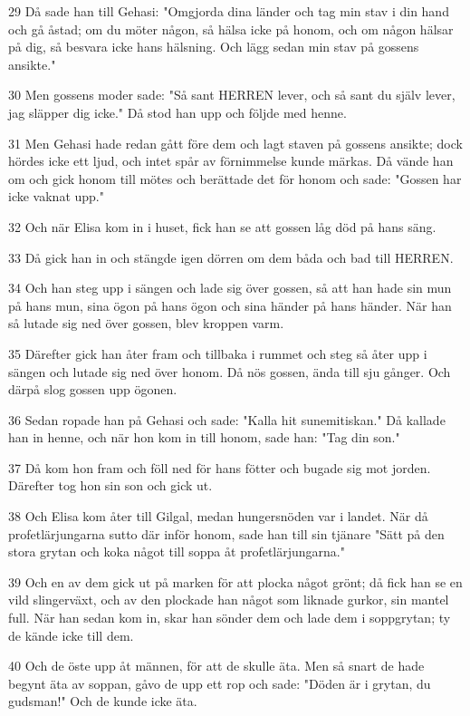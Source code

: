 \par 29 Då sade han till Gehasi: "Omgjorda dina länder och tag min stav i din hand och gå åstad; om du möter någon, så hälsa icke på honom, och om någon hälsar på dig, så besvara icke hans hälsning. Och lägg sedan min stav på gossens ansikte."
\par 30 Men gossens moder sade: "Så sant HERREN lever, och så sant du själv lever, jag släpper dig icke." Då stod han upp och följde med henne.
\par 31 Men Gehasi hade redan gått före dem och lagt staven på gossens ansikte; dock hördes icke ett ljud, och intet spår av förnimmelse kunde märkas. Då vände han om och gick honom till mötes och berättade det för honom och sade: "Gossen har icke vaknat upp."
\par 32 Och när Elisa kom in i huset, fick han se att gossen låg död på hans säng.
\par 33 Då gick han in och stängde igen dörren om dem båda och bad till HERREN.
\par 34 Och han steg upp i sängen och lade sig över gossen, så att han hade sin mun på hans mun, sina ögon på hans ögon och sina händer på hans händer. När han så lutade sig ned över gossen, blev kroppen varm.
\par 35 Därefter gick han åter fram och tillbaka i rummet och steg så åter upp i sängen och lutade sig ned över honom. Då nös gossen, ända till sju gånger. Och därpå slog gossen upp ögonen.
\par 36 Sedan ropade han på Gehasi och sade: "Kalla hit sunemitiskan." Då kallade han in henne, och när hon kom in till honom, sade han: "Tag din son."
\par 37 Då kom hon fram och föll ned för hans fötter och bugade sig mot jorden. Därefter tog hon sin son och gick ut.
\par 38 Och Elisa kom åter till Gilgal, medan hungersnöden var i landet. När då profetlärjungarna sutto där inför honom, sade han till sin tjänare "Sätt på den stora grytan och koka något till soppa åt profetlärjungarna."
\par 39 Och en av dem gick ut på marken för att plocka något grönt; då fick han se en vild slingerväxt, och av den plockade han något som liknade gurkor, sin mantel full. När han sedan kom in, skar han sönder dem och lade dem i soppgrytan; ty de kände icke till dem.
\par 40 Och de öste upp åt männen, för att de skulle äta. Men så snart de hade begynt äta av soppan, gåvo de upp ett rop och sade: "Döden är i grytan, du gudsman!" Och de kunde icke äta.
